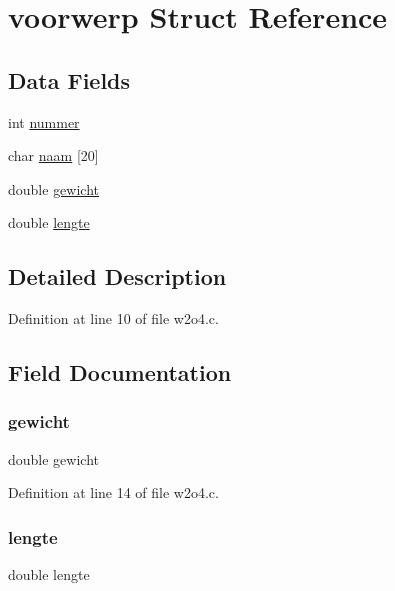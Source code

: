\hypertarget{structvoorwerp}{}\section{voorwerp Struct Reference}
\label{structvoorwerp}
\subsection*{Data Fields}
\begin{DoxyCompactItemize}
\item 
int \hyperlink{structvoorwerp_a8d3dda061d3629ccf7a7af17b49c585d}{nummer}
\item 
char \hyperlink{structvoorwerp_ac3df76d68400202ee97a661ef59a9336}{naam} \mbox{[}20\mbox{]}
\item 
double \hyperlink{structvoorwerp_aa5844a0a2400ef81eb87dd9dcdf145de}{gewicht}
\item 
double \hyperlink{structvoorwerp_a36ff629cfd3821ec44d05ddc61b7bee5}{lengte}
\end{DoxyCompactItemize}


\subsection{Detailed Description}


Definition at line 10 of file w2o4.\+c.



\subsection{Field Documentation}
\mbox{\label{structvoorwerp_aa5844a0a2400ef81eb87dd9dcdf145de}} 
\subsubsection{\texorpdfstring{gewicht}{gewicht}}
{\footnotesize\ttfamily double gewicht}



Definition at line 14 of file w2o4.\+c.

\mbox{\label{structvoorwerp_a36ff629cfd3821ec44d05ddc61b7bee5}} 
\subsubsection{\texorpdfstring{lengte}{lengte}}
{\footnotesize\ttfamily double lengte}



